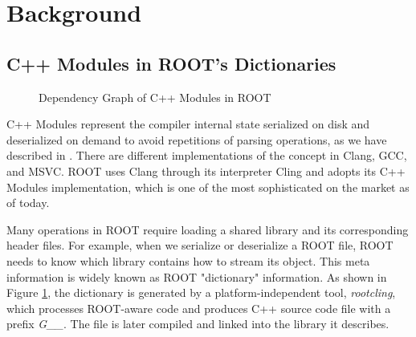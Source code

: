 \documentclass[12pt]{iopart}
\begin{document}
\section{Background}

\subsection{C++ Modules in ROOT's Dictionaries}
\label{intro}


\begin{figure}[!h]
  \centering
  \caption{Dependency Graph of C++ Modules in ROOT}
  \label{fig:graphofroot}
\end{figure}

C++ Modules represent the compiler internal state serialized on disk and deserialized on demand to avoid repetitions of parsing operations, as we have described in \cite{chep-modules}. There are different implementations of the concept in Clang, GCC, and MSVC. ROOT uses Clang through its interpreter Cling and adopts its C++ Modules implementation, which is one of the most sophisticated on the market as of today.

Many operations in ROOT require loading a shared library and its corresponding header files. For example, when we serialize or deserialize a ROOT file, ROOT needs to know which library contains how to stream its object. This meta information is widely known as ROOT "dictionary" information. As shown in Figure \ref{fig:graphofroot}, the dictionary is generated by a platform-independent tool, \textit{rootcling}, which processes ROOT-aware code and produces C++ source code file with a prefix \textit{G\_\_}. The file is later compiled and linked into the library it describes.
\end{document}
